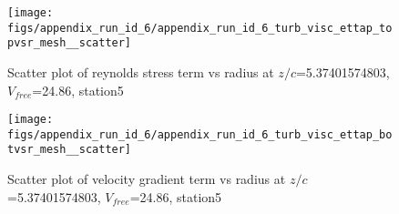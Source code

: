 \begin{figure}[H]
\centering
\texttt{[image: figs/appendix\_run\_id\_6/appendix\_run\_id\_6\_turb\_visc\_ettap\_topvsr\_mesh\_\_scatter]}
\caption{Scatter plot of reynolds stress term vs radius at $z/c$=5.37401574803, $V_{free}$=24.86, station5}
\label{fig:appendix_run_id_6_turb_visc_ettap_topvsr_mesh__scatter}
\end{figure}


\begin{figure}[H]
\centering
\texttt{[image: figs/appendix\_run\_id\_6/appendix\_run\_id\_6\_turb\_visc\_ettap\_botvsr\_mesh\_\_scatter]}
\caption{Scatter plot of velocity gradient term vs radius at $z/c$=5.37401574803, $V_{free}$=24.86, station5}
\label{fig:appendix_run_id_6_turb_visc_ettap_botvsr_mesh__scatter}
\end{figure}


